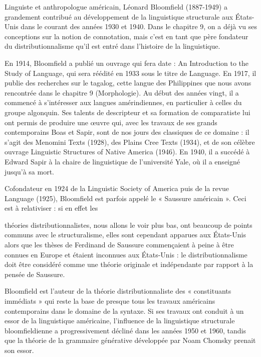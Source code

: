 Linguiste et anthropologue américain, Léonard Bloomfield (1887-1949) a grandement contribué au développement de la linguistique structurale aux États-Unis dans le courant des années 1930 et 1940. Dans le chapitre 9, on a déjà vu ses conceptions sur la notion de connotation, mais c’est en tant que père fondateur du distributionnalisme qu’il est entré dans l’histoire de la linguistique.\par

En 1914, Bloomfield a publié un ouvrage qui fera date : An Introduction to the Study of Language, qui sera réédité en 1933 sous le titre de Language. En 1917, il publie des recherches sur le tagalog, cette langue des Philippines que nous avons rencontrée dans le chapitre 9 (Morphologie). Au début des années vingt, il a commencé à s’intéresser aux langues amérindiennes, en particulier à celles du groupe algonquin. Ses talents de descripteur et sa formation de comparatiste lui ont permis de produire une œuvre qui, avec les travaux de ses grands contemporains Boas et Sapir, sont de nos jours des classiques de ce domaine : il s’agit des Menomini Texts (1928), des Plains Cree Texts (1934), et de son célèbre ouvrage Linguistic Structures of Native America (1946). En 1940, il a succédé à Edward Sapir à la chaire de linguistique de l’université Yale, où il a enseigné jusqu’à sa mort.\par

Cofondateur en 1924 de la Linguistic Society of America puis de la revue Language (1925), Bloomfield est parfois appelé le « Saussure américain ». Ceci est à relativiser : si en effet les\par


théories distributionnalistes, nous allons le voir plus bas, ont beaucoup de points communs avec le structuralisme, elles sont cependant apparues aux États-Unis alors que les thèses de Ferdinand de Saussure commençaient à peine à être connues en Europe et étaient inconnues aux États-Unis : le distributionnalisme doit être considéré comme une théorie originale et indépendante par rapport à la pensée de Saussure.\par

Bloomfield est l’auteur de la théorie distributionnaliste des « constituants immédiats » qui reste la base de presque tous les travaux américains contemporains dans le domaine de la syntaxe. Si ses travaux ont conduit à un essor de la linguistique américaine, l’influence de la linguistique structurale bloomfieldienne a progressivement décliné dans les années 1950 et 1960, tandis que la théorie de la grammaire générative développée par Noam Chomsky prenait son essor.\par

